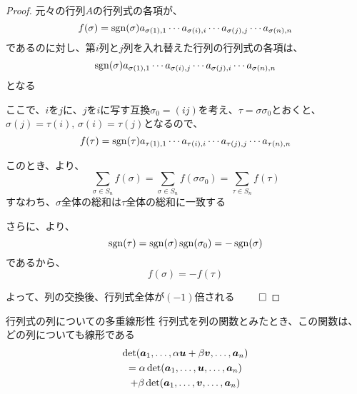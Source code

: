 \documentclass[../../../topic_linear-algebra]{subfiles}
\begin{document}
\begin{proof}
  元々の行列$A$の行列式の各項が、
  \begin{equation*}
    f(\sigma) =\operatorname{sgn}(\sigma) a_{\sigma(1),1} \cdots a_{\sigma(i),i} \cdots a_{\sigma(j),j} \cdots a_{\sigma(n),n}
  \end{equation*}
  であるのに対し、第$i$列と$j$列を入れ替えた行列の行列式の各項は、
  \begin{equation*}
    \operatorname{sgn}(\sigma) a_{\sigma(1),1} \cdots a_{\sigma(i),j} \cdots a_{\sigma(j),i} \cdots a_{\sigma(n),n}
  \end{equation*}
  となる

  ここで、$i$を$j$に、$j$を$i$に写す互換$\sigma_0 = (ij)$を考え、$\tau = \sigma \sigma_0$とおくと、$\sigma(j) = \tau(i), \, \sigma(i) = \tau(j)$となるので、
  \begin{equation*}
    f(\tau) = \operatorname{sgn}(\tau) a_{\tau(1),1} \cdots a_{\tau(i),i} \cdots a_{\tau(j),j} \cdots a_{\tau(n),n}
  \end{equation*}

  このとき、より、
  \begin{equation*}
    \sum_{\sigma \in S_n} f(\sigma) = \sum_{\sigma \in S_n} f(\sigma\sigma_0) = \sum_{\tau \in S_n} f(\tau)
  \end{equation*}
  すなわち、$\sigma$全体の総和は$\tau$全体の総和に一致する

  \br

  さらに、より、
  \begin{equation*}
    \operatorname{sgn}(\tau) = \operatorname{sgn}(\sigma) \operatorname{sgn}(\sigma_0) = -\operatorname{sgn}(\sigma)
  \end{equation*}
  であるから、
  \begin{equation*}
    f(\sigma) = -f(\tau)
  \end{equation*}

  よって、列の交換後、行列式全体が$(-1)$倍される $\qed$
\end{proof}

\sectionline

\begin{theorem*}{行列式の列についての多重線形性}
  行列式を列の関数とみたとき、この関数は、どの列についても線形である
  \begin{multline*}
    \det(\vb*{a}_1,\ldots,\alpha\vb*{u} + \beta\vb*{v}, \ldots, \vb*{a}_n) \\
    = \alpha\det(\vb*{a}_1,\ldots,\vb*{u},\ldots,\vb*{a}_n) \\
    + \beta\det(\vb*{a}_1,\ldots,\vb*{v},\ldots,\vb*{a}_n)
  \end{multline*}
\end{theorem*}
\end{document}
